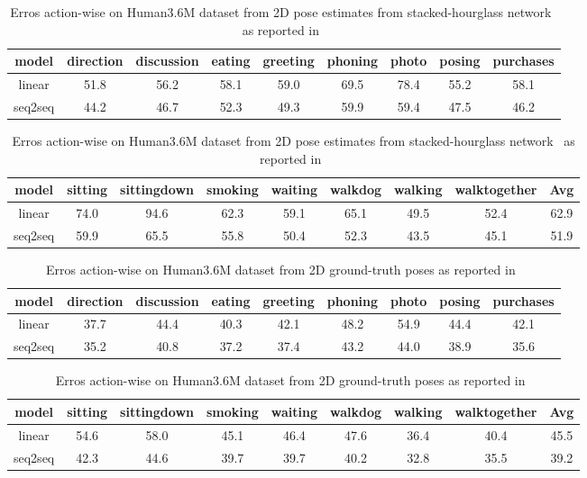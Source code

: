 \documentclass[12pt,a4paper,onecolumn]{article}
\begin{document}
\begin{table}
	\begin{tabular}{*{9}{c}}
		\toprule
		model & direction & discussion & eating & greeting & phoning & photo & posing & purchases\\
		\midrule
		linear         & 51.8 & 56.2 & 58.1 & 59.0 & 69.5 & 78.4 & 55.2 & 58.1 \\
		seq2seq         & 44.2 & 46.7 & 52.3 & 49.3 & 59.9 & 59.4 & 47.5 & 46.2 \\
		\bottomrule
	\end{tabular}

	\vspace{1cm}

	\begin{tabular}{*{9}c}
		\toprule
		 model & sitting & sittingdown & smoking & waiting & walkdog & walking & walktogether & Avg\\
		 \midrule
		 linear & 74.0 & 94.6 & 62.3 & 59.1 & 65.1 & 49.5 & 52.4 & 62.9  \\
		 \midrule
		 seq2seq  & 59.9 & 65.5 & 55.8 & 50.4 & 52.3 & 43.5 & 45.1 & 51.9 \\
	\end{tabular}
	\caption{Erros action-wise on Human3.6M dataset from 2D pose estimates from stacked-hourglass network~\parencite{newell2016} as reported in~\parencite{hossain2017exploiting}}
	\label{tab_res_sh_to_3d}
\end{table}


\begin{table}
	\begin{tabular}{*{9}{c}}
		\toprule
		model & direction & discussion & eating & greeting & phoning & photo & posing & purchases\\
		\midrule
		linear & 37.7 & 44.4 & 40.3 & 42.1 & 48.2 & 54.9 & 44.4 & 42.1  \\
		seq2seq  & 35.2 & 40.8 & 37.2 & 37.4 & 43.2 & 44.0 & 38.9 & 35.6 \\
		\bottomrule
	\end{tabular}

	\vspace{1cm}

	\begin{tabular}{*{9}c}
		\toprule
		 model & sitting & sittingdown & smoking & waiting & walkdog & walking & walktogether & Avg\\
		 \midrule
		 linear  & 54.6 & 58.0 & 45.1 & 46.4 & 47.6 & 36.4 & 40.4 & 45.5 \\
		 seq2seq & 42.3 & 44.6 & 39.7 & 39.7 & 40.2 & 32.8 & 35.5 & 39.2 \\
	\end{tabular}
	\caption{Erros action-wise on Human3.6M dataset from 2D ground-truth poses as reported in~\parencite{hossain2017exploiting}}
	\label{tab_res_sh_to_3d}
\end{table}

\printbibliography
\end{document}

